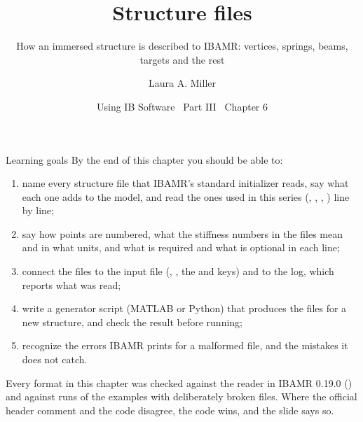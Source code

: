 \documentclass[aspectratio=169,11pt]{beamer}
\title[Structure files]{Structure files}
\subtitle{How an immersed structure is described to IBAMR: vertices, springs, beams, targets and the rest}
\author[Miller]{Laura A. Miller}
\institute[UArizona]{Department of Mathematics, University of Arizona}
\date{Using IB Software \textbullet\ Part III \textbullet\ Chapter 6}
\begin{document}
\begin{frame}[plain]
\end{frame}

\begin{frame}{Learning goals}
\small By the end of this chapter you should be able to:
\begin{enumerate}
  \item name every structure file that IBAMR's standard initializer reads, say what each one adds to the model, and read the ones used in this series (, , , ) line by line;
  \item say how points are numbered, what the stiffness numbers in the files mean and in what units, and what is required and what is optional in each line;
  \item connect the files to the input file (, , the  and  keys) and to the log, which reports what was read;
  \item write a generator script (MATLAB or Python) that produces the files for a new structure, and check the result before running;
  \item recognize the errors IBAMR prints for a malformed file, and the mistakes it does not catch.
\end{enumerate}
\vspace{2mm}
\begin{punchbox}
\small Every format in this chapter was checked against the reader in IBAMR 0.19.0 () and against runs of the examples with deliberately broken files. Where the official header comment and the code disagree, the code wins, and the slide says so.
\end{punchbox}
\end{frame}
\end{document}
